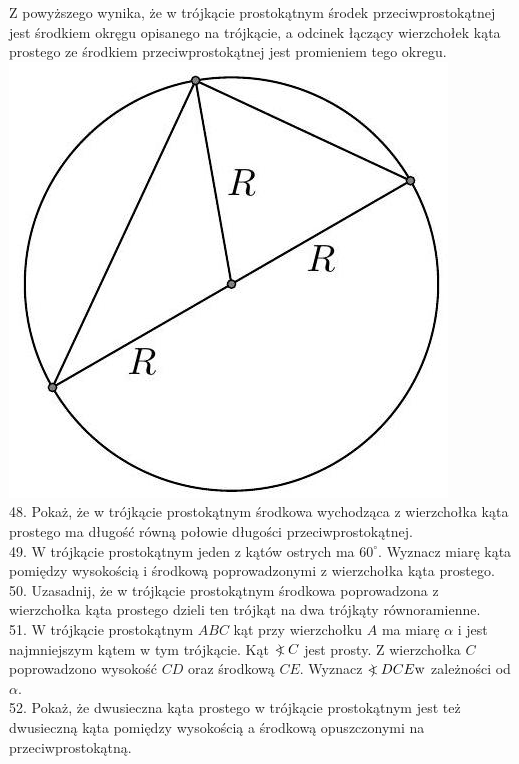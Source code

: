\documentclass[10pt]{article}
\newcommand\Varangle{\mathop{{<\!\!\!\!\!\text{\small)}}\:}\nolimits}
\begin{document}
Z powyższego wynika, że w trójkącie prostokątnym środek przeciwprostokątnej jest środkiem okręgu opisanego na trójkącie, a odcinek łączący wierzchołek kąta prostego ze środkiem przeciwprostokątnej jest promieniem tego okregu.\\
\includegraphics[max width=\textwidth, center]{2024_11_21_71f62bd117d375398909g-191}\\
48. Pokaż, że w trójkącie prostokątnym środkowa wychodząca z wierzchołka kąta prostego ma długość równą połowie długości przeciwprostokątnej.\\
49. W trójkącie prostokątnym jeden z kątów ostrych ma \(60^{\circ}\). Wyznacz miarę kąta pomiędzy wysokością i środkową poprowadzonymi z wierzchołka kąta prostego.\\
50. Uzasadnij, że w trójkącie prostokątnym środkowa poprowadzona z wierzchołka kąta prostego dzieli ten trójkąt na dwa trójkąty równoramienne.\\
51. W trójkącie prostokątnym \(A B C\) kąt przy wierzchołku \(A\) ma miarę \(\alpha\) i jest najmniejszym kątem w tym trójkącie. Kąt \(\Varangle C\) jest prosty. Z wierzchołka \(C\) poprowadzono wysokość \(C D\) oraz środkową \(C E\). Wyznacz \(\Varangle D C E \mathrm{w}\) zależności od \(\alpha\).\\
52. Pokaż, że dwusieczna kąta prostego w trójkącie prostokątnym jest też dwusieczną kąta pomiędzy wysokością a środkową opuszczonymi na przeciwprostokątną.\\
\end{document}
